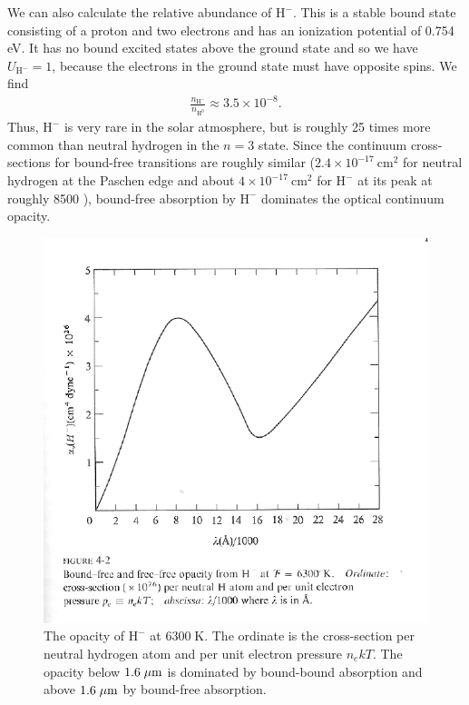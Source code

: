 We can also calculate the relative abundance of
$\mathrm{H^-}$. This is a stable bound state consisting of a
proton and two electrons and has an ionization potential of
0.754 eV. It has no bound excited states above the ground
state and so we have $U_\mathrm{H^-} = 1$, because the
electrons in the ground state must have opposite spins. We
find
\begin{align}
\frac{n_\mathrm{H^-}}{n_\mathrm{H^0}}
\approx 
3.5 \times 10^{-8}.
\end{align}
Thus, $\mathrm{H^-}$ is very rare in the solar atmosphere,
but is roughly 25 times more common than neutral hydrogen in
the $n=3$ state. Since the continuum cross-sections for
bound-free transitions are roughly similar ($2.4 \times
10^{-17}\:\mathrm{cm^{2}}$ for neutral hydrogen at the
Paschen edge and about $4 \times 10^{-17}\:\mathrm{cm^{2}}$
for $\mathrm{H^-}$ at its peak at roughly 8500 {\Angstrom}),
bound-free absorption by $\mathrm{H^-}$ dominates the
optical continuum opacity.

\begin{figure}
\centering
\includegraphics[width=0.7\linewidth]{figures/h-minus.pdf}
\caption{The opacity of $\mathrm{H}^-$ at $6300\;\mathrm{K}$. The ordinate is the cross-section per neutral hydrogen atom and per unit electron pressure $n_e kT$. The opacity below $1.6\;\mbox{$\mu$m}$ is dominated by bound-bound absorption and above $1.6\;\mbox{$\mu$m}$ by bound-free absorption.}
\end{figure}

